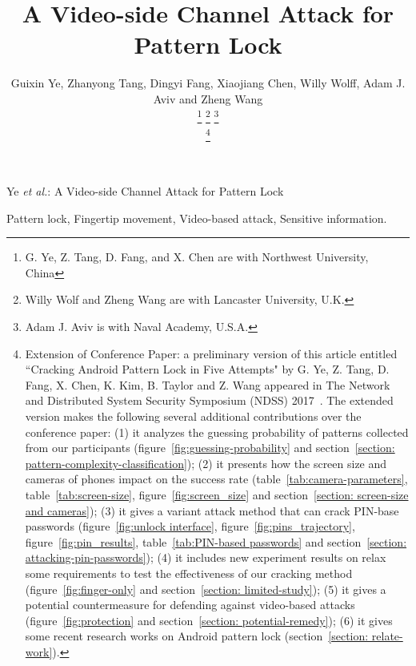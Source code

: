 \documentclass[journal,table,twoside]{IEEEtran}
\begin{document}
\title{A Video-side Channel Attack for Pattern Lock}
\author{Guixin Ye, Zhanyong Tang, Dingyi Fang, Xiaojiang Chen,
        Willy Wolff, Adam J. Aviv and Zheng Wang

    \thanks{G. Ye, Z. Tang, D. Fang, and X. Chen are with Northwest University, China}%
    \thanks{Willy Wolf and Zheng Wang are with Lancaster University, U.K.}
    \thanks{Adam J. Aviv is with Naval Academy, U.S.A.}

    \thanks{
            Extension of Conference Paper: a preliminary version of this article entitled ``Cracking Android Pattern Lock
            in Five Attempts" by G. Ye, Z. Tang, D. Fang, X. Chen, K. Kim, B. Taylor and Z. Wang appeared in
            The Network and Distributed System Security Symposium (NDSS) 2017~\cite{ye2017cracking}.
            The extended version makes the following several additional contributions over the conference
            paper: (1) it analyzes the guessing probability of patterns collected from our participants (figure~\ref{fig:guessing-probability} and section~\ref{section: pattern-complexity-classification});
            (2) it presents how the screen size and cameras of phones impact on the success rate (table~\ref{tab:camera-parameters}, table~\ref{tab:screen-size}, figure~\ref{fig:screen_size} and section~\ref{section: screen-size and cameras});
            (3) it gives a variant attack method that can crack PIN-base passwords (figure~\ref{fig:unlock interface}, figure~\ref{fig:pins_trajectory}, figure~\ref{fig:pin_results}, table~\ref{tab:PIN-based passwords} and section~\ref{section: attacking-pin-passwords});
            (4) it includes new experiment results on relax some requirements to test the effectiveness of our cracking method (figure~\ref{fig:finger-only} and section~\ref{section: limited-study});
            (5) it gives a potential countermeasure for defending against video-based attacks (figure~\ref{fig:protection} and section~\ref{section: potential-remedy});
            (6) it gives some recent research works on Android pattern lock (section~\ref{section: relate-work}).
    }
}

%
{Ye \MakeLowercase{\textit{et al.}}: A Video-side Channel Attack for Pattern Lock}

\maketitle



\begin{IEEEkeywords}
    Pattern lock, Fingertip movement, Video-based attack, Sensitive information.
\end{IEEEkeywords}












\IEEEpeerreviewmaketitle


\ifCLASSOPTIONcaptionsoff
  \newpage
\fi


\balance

\end{document}
